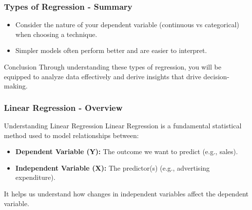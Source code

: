 \documentclass[aspectratio=169]{beamer}
\begin{document}
\begin{frame}[fragile]
    \frametitle{Types of Regression - Summary}
    \begin{itemize}
        \item Consider the nature of your dependent variable (continuous vs categorical) when choosing a technique.
        \item Simpler models often perform better and are easier to interpret.
    \end{itemize}
    \begin{block}{Conclusion}
        Through understanding these types of regression, you will be equipped to analyze data effectively and derive insights that drive decision-making.
    \end{block}
\end{frame}

\begin{frame}[fragile]
    \frametitle{Linear Regression - Overview}
    \begin{block}{Understanding Linear Regression}
        Linear Regression is a fundamental statistical method used to model relationships between:
        \begin{itemize}
            \item \textbf{Dependent Variable (Y):} The outcome we want to predict (e.g., sales).
            \item \textbf{Independent Variable (X):} The predictor(s) (e.g., advertising expenditure).
        \end{itemize}
        It helps us understand how changes in independent variables affect the dependent variable.
    \end{block}
\end{frame}
\end{document}

